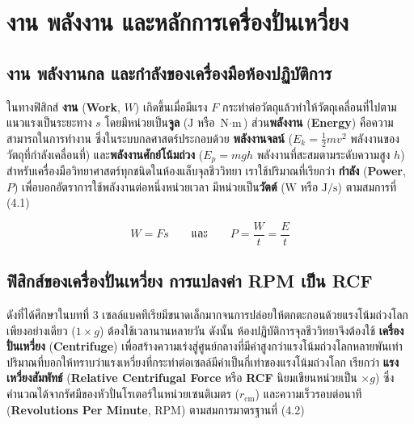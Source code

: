 \clearpage

\chapter{งาน พลังงาน และหลักการเครื่องปั่นเหวี่ยง}

\section{งาน พลังงานกล และกำลังของเครื่องมือห้องปฏิบัติการ}

ในทางฟิสิกส์ \textbf{งาน} (\textbf{Work}, $W$) เกิดขึ้นเมื่อมีแรง $F$ กระทำต่อวัตถุแล้วทำให้วัตถุเคลื่อนที่ไปตามแนวแรงเป็นระยะทาง $s$ โดยมีหน่วยเป็น\textbf{จูล} ($\text{J}$ หรือ $\text{N}\cdot\text{m}$) ส่วน\textbf{พลังงาน} (\textbf{Energy}) คือความสามารถในการทำงาน ซึ่งในระบบกลศาสตร์ประกอบด้วย \textbf{พลังงานจลน์} ($E_k = \frac{1}{2}mv^2$ พลังงานของวัตถุที่กำลังเคลื่อนที่) และ\textbf{พลังงานศักย์โน้มถ่วง} ($E_p = mgh$ พลังงานที่สะสมตามระดับความสูง $h$) สำหรับเครื่องมือวิทยาศาสตร์ทุกชนิดในห้องแล็บจุลชีววิทยา เราใช้ปริมาณที่เรียกว่า \textbf{กำลัง} (\textbf{Power}, $P$) เพื่อบอกอัตราการใช้พลังงานต่อหนึ่งหน่วยเวลา มีหน่วยเป็น\textbf{วัตต์} ($\text{W}$ หรือ $\text{J/s}$) ตามสมการที่ (4.1)

\begin{equation}
    W = F s \qquad \text{และ} \qquad P = \frac{W}{t} = \frac{E}{t}
\end{equation}

\section{ฟิสิกส์ของเครื่องปั่นเหวี่ยง การแปลงค่า RPM เป็น RCF}

ดังที่ได้ศึกษาในบทที่ 3 เซลล์แบคทีเรียมีขนาดเล็กมากจนการปล่อยให้ตกตะกอนด้วยแรงโน้มถ่วงโลกเพียงอย่างเดียว ($1\times g$) ต้องใช้เวลานานหลายวัน ดังนั้น ห้องปฏิบัติการจุลชีววิทยาจึงต้องใช้ \textbf{เครื่องปั่นเหวี่ยง} (\textbf{Centrifuge}) เพื่อสร้างความเร่งสู่ศูนย์กลางที่มีค่าสูงกว่าแรงโน้มถ่วงโลกหลายพันเท่า ปริมาณที่บอกให้ทราบว่าแรงเหวี่ยงที่กระทำต่อเซลล์มีค่าเป็นกี่เท่าของแรงโน้มถ่วงโลก เรียกว่า \textbf{แรงเหวี่ยงสัมพัทธ์} (\textbf{Relative Centrifugal Force} หรือ \textbf{RCF} นิยมเขียนหน่วยเป็น $\times g$) ซึ่งคำนวณได้จากรัศมีของหัวปั่นโรเตอร์ในหน่วยเซนติเมตร ($r_{\text{cm}}$) และความเร็วรอบต่อนาที (\textbf{Revolutions Per Minute}, $\text{RPM}$) ตามสมการมาตรฐานที่ (4.2)

